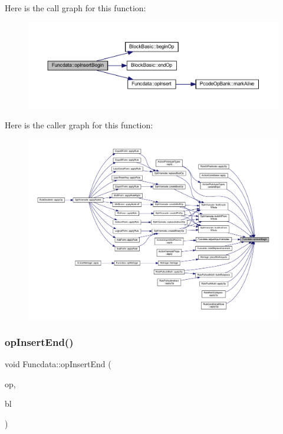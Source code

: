 Here is the call graph for this function\+:
\nopagebreak
\begin{figure}[H]
\begin{center}
\leavevmode
\includegraphics[width=350pt]{class_funcdata_ae6341eb8ca8a8004f1c77a8e8147a286_cgraph}
\end{center}
\end{figure}
Here is the caller graph for this function\+:
\nopagebreak
\begin{figure}[H]
\begin{center}
\leavevmode
\includegraphics[width=350pt]{class_funcdata_ae6341eb8ca8a8004f1c77a8e8147a286_icgraph}
\end{center}
\end{figure}
\mbox{\label{class_funcdata_ad544a6136ff019bbd18c45043e9b6900}} 
\subsubsection{\texorpdfstring{opInsertEnd()}{opInsertEnd()}}
{\footnotesize\ttfamily void Funcdata\+::op\+Insert\+End (\begin{DoxyParamCaption}\item[{\mbox{\hyperlink{class_pcode_op}{Pcode\+Op}} $\ast$}]{op,  }\item[{\mbox{\hyperlink{class_block_basic}{Block\+Basic}} $\ast$}]{bl }\end{DoxyParamCaption})}



